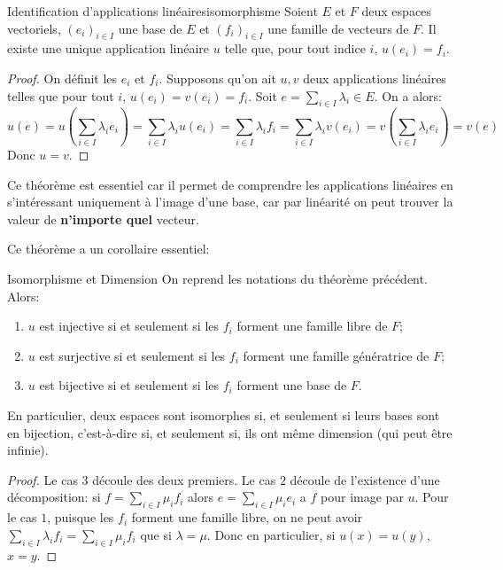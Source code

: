 \documentclass{classe}
\begin{document}
\begin{théorème}{Identification d'applications linéaires}{isomorphisme}
	Soient $E$ et $F$ deux espaces vectoriels, $(e_i)_{i\in I}$ une base de $E$ et $(f_i)_{i\in I}$ une famille de vecteurs de $F$. Il existe une unique application linéaire $u$ telle que, pour tout indice $i$, $u(e_{i}) = f_{i}$.
\end{théorème}
\begin{proof}
	On définit les $e_{i}$ et $f_{i}$.
	Supposons qu'on ait $u, v$ deux applications linéaires telles que pour tout $i$, $u\left( e_{i} \right) = v\left( e_{i} \right) = f_{i}$.
	Soit $e = \sum_{i \in I} \lambda_{i} \in E$. On a alors:
	\begin{equation*}
		u(e) = u\left(\sum_{i \in I}\lambda_{i}e_{i}\right) = \sum_{i \in I}\lambda_{i}u\left( e_{i} \right) = \sum_{i \in I}\lambda_{i}f_{i} = \sum_{i \in I} \lambda_{i}v\left( e_{i} \right) = v\left( \sum_{i \in I}\lambda_{i}e_{i} \right) = v\left( e \right)
	\end{equation*}
	Donc $u = v$.
\end{proof}

Ce théorème est essentiel car il permet de comprendre les applications linéaires en s'intéressant uniquement à l'image d'une base, car par linéarité on peut trouver la valeur de \textbf{n'importe quel} vecteur.

Ce théorème a un corollaire essentiel:
\begin{théorème}{Isomorphisme et Dimension}{}
	On reprend les notations du théorème précédent. Alors:
	\begin{enumerate}
		\item $u$ est injective si et seulement si les $f_{i}$ forment une famille libre de $F$;
		\item $u$ est surjective si et seulement si les $f_{i}$ forment une famille génératrice de $F$;
		\item $u$ est bijective si et seulement si les $f_{i}$ forment une base de $F$.
	\end{enumerate}
	En particulier, deux espaces sont isomorphes si, et seulement si leurs bases sont en bijection, c'est-à-dire si, et seulement si, ils ont même dimension (qui peut être infinie).
\end{théorème}
\begin{proof}
	Le cas $3$ découle des deux premiers.
	Le cas $2$ découle de l'existence d'une décomposition: si $f = \sum_{i\in I}\mu_{i}f_{i}$ alors $e = \sum_{i\in I}\mu_{i}e_{i}$ a $f$ pour image par $u$.
	Pour le cas $1$, puisque les $f_{i}$ forment une famille libre, on ne peut avoir $\sum_{i \in I}\lambda_{i}f_{i} = \sum_{i\in I}\mu_{i}f_{i}$ que si $\lambda = \mu$.
	Donc en particulier, si $u(x) = u(y)$, $x = y$.
\end{proof}
\end{document}
